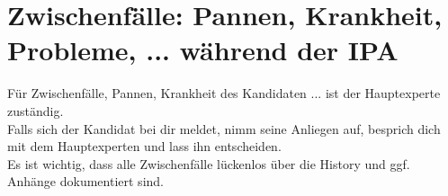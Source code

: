 \section{Zwischenfälle: Pannen, Krankheit, Probleme, ... während der IPA}
Für Zwischenfälle, Pannen, Krankheit des Kandidaten ... ist der Hauptexperte zuständig.\\
Falls sich der Kandidat bei dir meldet, nimm seine Anliegen auf, besprich dich mit dem Hauptexperten und lass ihn entscheiden.\\
Es ist wichtig, dass alle Zwischenfälle lückenlos über die History und ggf. Anhänge dokumentiert sind.
